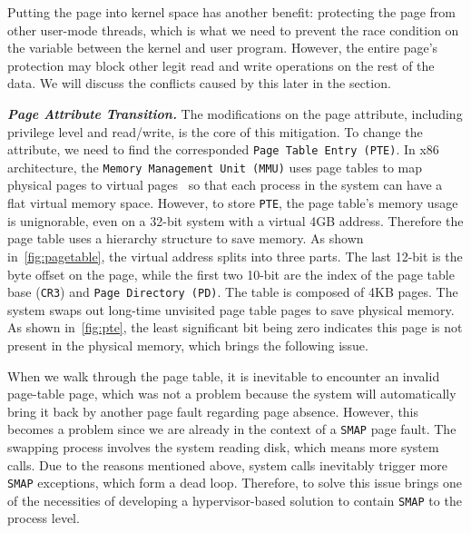 Putting the page into kernel space has another benefit: protecting the page from other user-mode threads, which is what we need to prevent the race condition on the variable between the kernel and user program. However, the entire page's protection may block other legit read and write operations on the rest of the data. We will discuss the conflicts caused by this later in the section.




\textbf{\textit{Page Attribute Transition.}} The modifications on the page attribute, including privilege level and read/write, is the core of this mitigation. To change the attribute, we need to find the corresponded \texttt{Page Table Entry (PTE)}.  In x86 architecture, the \texttt{Memory Management Unit (MMU)} uses page tables to map physical pages to virtual pages~\cite{intelpaging} so that each process in the system can have a flat virtual memory space. However, to store \texttt{PTE}, the page table's memory usage is unignorable, even on a 32-bit system with a virtual 4GB address. Therefore the page table uses a hierarchy structure to save memory. As shown in~\autoref{fig:pagetable}, the virtual address splits into three parts. The last 12-bit is the byte offset on the page, while the first two 10-bit are the index of the page table base (\texttt{CR3}) and \texttt{Page Directory (PD)}. The table is composed of 4KB pages.  The system swaps out long-time unvisited page table pages to save physical memory. As shown in~\autoref{fig:pte}, the least significant bit being zero indicates this page is not present in the physical memory, which brings the following issue. 

When we walk through the page table, it is inevitable to encounter an invalid page-table page, which was not a problem because the system will automatically bring it back by another page fault regarding page absence. However, this becomes a problem since we are already in the context of a \texttt{SMAP} page fault. The swapping process involves the system reading disk, which means more system calls. Due to the reasons mentioned above, system calls inevitably trigger more \texttt{SMAP} exceptions, which form a dead loop. Therefore, to solve this issue brings one of the necessities of developing a hypervisor-based solution to contain \texttt{SMAP} to the process level. 



